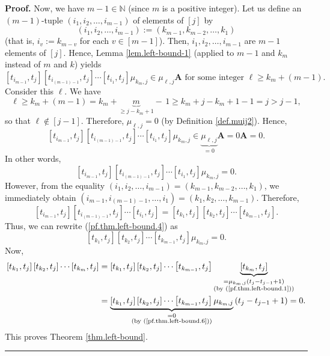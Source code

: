 \documentclass[numbers=enddot,12pt,final,onecolumn,notitlepage]{scrartcl}%
\theoremstyle{definition}
\newenvironment{proof}[1][Proof]{\noindent\textbf{#1.} }{\ \rule{0.5em}{0.5em}}
\begin{document}
\begin{proof}
Now, we have $m-1\in\mathbb{N}$ (since $m$ is a positive integer). Let us
define an $\left(  m-1\right)  $-tuple $\left(  i_{1},i_{2},\ldots
,i_{m-1}\right)  $ of elements of $\left[  j\right]  $ by%
\[
\left(  i_{1},i_{2},\ldots,i_{m-1}\right)  :=\left(  k_{m-1},k_{m-2}%
,\ldots,k_{1}\right)
\]
(that is, $i_{v}:=k_{m-v}$ for each $v\in\left[  m-1\right]  $). Then,
$i_{1},i_{2},\ldots,i_{m-1}$ are $m-1$ elements of $\left[  j\right]  $.
Hence, Lemma \ref{lem.left-bound-1} (applied to $m-1$ and $k_{m}$ instead of
$m$ and $k$) yields
\[
\left[  t_{i_{m-1}},t_{j}\right]  \left[  t_{i_{\left(  m-1\right)  -1}}%
,t_{j}\right]  \cdots\left[  t_{i_{1}},t_{j}\right]  \mu_{k_{m},j}\in\mu
_{\ell,j}\mathbf{A}\text{ for some integer }\ell\geq k_{m}+\left(  m-1\right)
.
\]
Consider this $\ell$. We have%
\[
\ell\geq k_{m}+\left(  m-1\right)  =k_{m}+\underbrace{m}_{\geq j-k_{m}%
+1}-\,1\geq k_{m}+j-k_{m}+1-1=j>j-1,
\]
so that $\ell\notin\left[  j-1\right]  $. Therefore, $\mu_{\ell,j}=0$ (by
Definition \ref{def.muij2}). Hence,%
\[
\left[  t_{i_{m-1}},t_{j}\right]  \left[  t_{i_{\left(  m-1\right)  -1}}%
,t_{j}\right]  \cdots\left[  t_{i_{1}},t_{j}\right]  \mu_{k_{m},j}%
\in\underbrace{\mu_{\ell,j}}_{=0}\mathbf{A}=0\mathbf{A}=0.
\]
In other words,%
\begin{equation}
\left[  t_{i_{m-1}},t_{j}\right]  \left[  t_{i_{\left(  m-1\right)  -1}}%
,t_{j}\right]  \cdots\left[  t_{i_{1}},t_{j}\right]  \mu_{k_{m},j}=0.
\label{pf.thm.left-bound.4}%
\end{equation}
However, from the equality $\left(  i_{1},i_{2},\ldots,i_{m-1}\right)
=\left(  k_{m-1},k_{m-2},\ldots,k_{1}\right)  $, we immediately obtain
$\left(  i_{m-1},i_{\left(  m-1\right)  -1},\ldots,i_{1}\right)  =\left(
k_{1},k_{2},\ldots,k_{m-1}\right)  $. Therefore,%
\[
\left[  t_{i_{m-1}},t_{j}\right]  \left[  t_{i_{\left(  m-1\right)  -1}}%
,t_{j}\right]  \cdots\left[  t_{i_{1}},t_{j}\right]  =\left[  t_{k_{1}}%
,t_{j}\right]  \left[  t_{k_{2}},t_{j}\right]  \cdots\left[  t_{k_{m-1}}%
,t_{j}\right]  .
\]
Thus, we can rewrite (\ref{pf.thm.left-bound.4}) as%
\begin{equation}
\left[  t_{k_{1}},t_{j}\right]  \left[  t_{k_{2}},t_{j}\right]  \cdots\left[
t_{k_{m-1}},t_{j}\right]  \mu_{k_{m},j}=0. \label{pf.thm.left-bound.6}%
\end{equation}
Now,%
\begin{align*}
\left[  t_{k_{1}},t_{j}\right]  \left[  t_{k_{2}},t_{j}\right]  \cdots\left[
t_{k_{m}},t_{j}\right]   &  =\left[  t_{k_{1}},t_{j}\right]  \left[  t_{k_{2}%
},t_{j}\right]  \cdots\left[  t_{k_{m-1}},t_{j}\right]  \underbrace{\left[
t_{k_{m}},t_{j}\right]  }_{\substack{=\mu_{k_{m},j}\left(  t_{j}%
-t_{j-1}+1\right)  \\\text{(by (\ref{pf.thm.left-bound.1}))}}}\\
&  =\underbrace{\left[  t_{k_{1}},t_{j}\right]  \left[  t_{k_{2}}%
,t_{j}\right]  \cdots\left[  t_{k_{m-1}},t_{j}\right]  \mu_{k_{m},j}%
}_{\substack{=0\\\text{(by (\ref{pf.thm.left-bound.6}))}}}\left(
t_{j}-t_{j-1}+1\right)  =0.
\end{align*}
This proves Theorem \ref{thm.left-bound}.
\end{proof}
\end{document}

